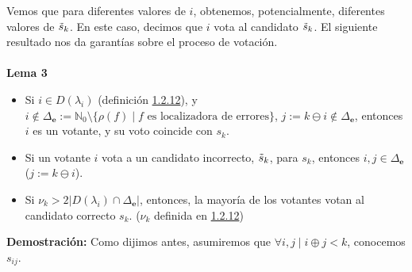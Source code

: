 \documentclass[11pt,spanish]{book}
\begin{document}
Vemos que para diferentes valores de $i$, obtenemos, potencialmente, diferentes valores de $\Tilde{s}_k$. En este caso, decimos que $i$ vota al candidato $\Tilde{s}_k$. El siguiente resultado nos da garantías sobre el proceso de votación.\\ 
\\ \textbf{Lema 3}
\begin{itemize}
    \item Si $i\in D(\lambda_i)$ (definición \hyperlink{def5.2.5}{1.2.12}), y $i\notin \Delta_{\mathbf{e}}:=\mathbb{N}_0\setminus \{\rho (f)\;|\;f \text{ es localizadora de errores}\}$, $j:=k\ominus i\notin \Delta_{\mathbf{e}}$, entonces $i$ es un votante, y su voto coincide con $s_k$.
    \item Si un votante $i$ vota a un candidato incorrecto, $\Tilde{s}_{k}$, para $s_k$, entonces $i, j \in \Delta_{\mathbf{e}}$ ($j:=k\ominus i$). 
    \item Si $\nu_k >2|D(\lambda_i) \cap \Delta_{\mathbf{e}}|$, entonces, la mayoría de los votantes votan al candidato correcto $s_k$.  ($\nu_k$ definida en \hyperlink{def5.2.5}{1.2.12}) 
\end{itemize}
\textbf{Demostración: } Como dijimos antes, asumiremos que $\forall i,j\;|\; i\oplus j< k$, conocemos $s_{ij}$.
\end{document}
